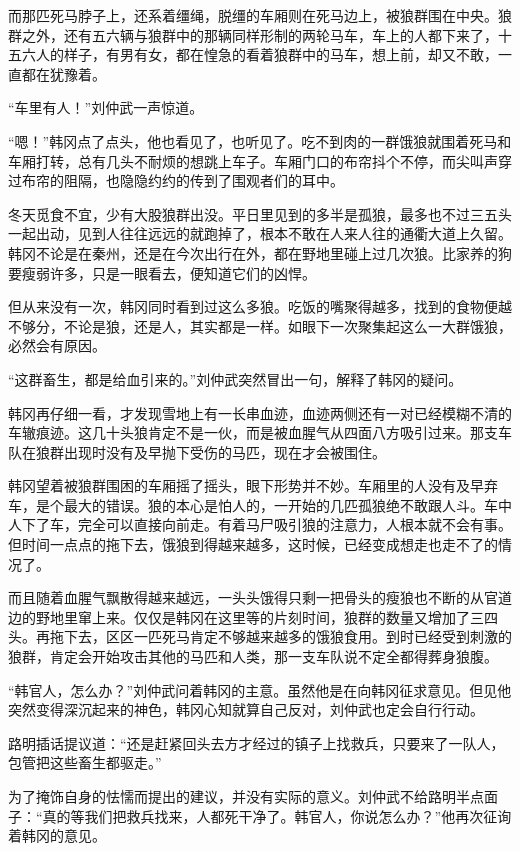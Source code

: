 而那匹死马脖子上，还系着缰绳，脱缰的车厢则在死马边上，被狼群围在中央。狼群之外，还有五六辆与狼群中的那辆同样形制的两轮马车，车上的人都下来了，十五六人的样子，有男有女，都在惶急的看着狼群中的马车，想上前，却又不敢，一直都在犹豫着。

“车里有人！”刘仲武一声惊道。

“嗯！”韩冈点了点头，他也看见了，也听见了。吃不到肉的一群饿狼就围着死马和车厢打转，总有几头不耐烦的想跳上车子。车厢门口的布帘抖个不停，而尖叫声穿过布帘的阻隔，也隐隐约约的传到了围观者们的耳中。

冬天觅食不宜，少有大股狼群出没。平日里见到的多半是孤狼，最多也不过三五头一起出动，见到人往往远远的就跑掉了，根本不敢在人来人往的通衢大道上久留。韩冈不论是在秦州，还是在今次出行在外，都在野地里碰上过几次狼。比家养的狗要瘦弱许多，只是一眼看去，便知道它们的凶悍。

但从来没有一次，韩冈同时看到过这么多狼。吃饭的嘴聚得越多，找到的食物便越不够分，不论是狼，还是人，其实都是一样。如眼下一次聚集起这么一大群饿狼，必然会有原因。

“这群畜生，都是给血引来的。”刘仲武突然冒出一句，解释了韩冈的疑问。

韩冈再仔细一看，才发现雪地上有一长串血迹，血迹两侧还有一对已经模糊不清的车辙痕迹。这几十头狼肯定不是一伙，而是被血腥气从四面八方吸引过来。那支车队在狼群出现时没有及早抛下受伤的马匹，现在才会被围住。

韩冈望着被狼群围困的车厢摇了摇头，眼下形势并不妙。车厢里的人没有及早弃车，是个最大的错误。狼的本心是怕人的，一开始的几匹孤狼绝不敢跟人斗。车中人下了车，完全可以直接向前走。有着马尸吸引狼的注意力，人根本就不会有事。但时间一点点的拖下去，饿狼到得越来越多，这时候，已经变成想走也走不了的情况了。

而且随着血腥气飘散得越来越远，一头头饿得只剩一把骨头的瘦狼也不断的从官道边的野地里窜上来。仅仅是韩冈在这里等的片刻时间，狼群的数量又增加了三四头。再拖下去，区区一匹死马肯定不够越来越多的饿狼食用。到时已经受到刺激的狼群，肯定会开始攻击其他的马匹和人类，那一支车队说不定全都得葬身狼腹。

“韩官人，怎么办？”刘仲武问着韩冈的主意。虽然他是在向韩冈征求意见。但见他突然变得深沉起来的神色，韩冈心知就算自己反对，刘仲武也定会自行行动。

路明插话提议道：“还是赶紧回头去方才经过的镇子上找救兵，只要来了一队人，包管把这些畜生都驱走。”

为了掩饰自身的怯懦而提出的建议，并没有实际的意义。刘仲武不给路明半点面子：“真的等我们把救兵找来，人都死干净了。韩官人，你说怎么办？”他再次征询着韩冈的意见。

